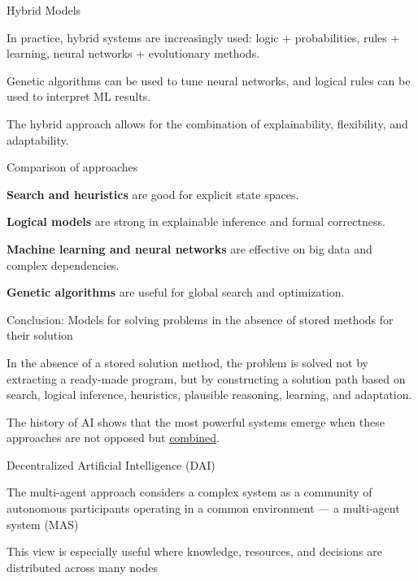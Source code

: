 \begin{frame}{Hybrid Models}
	\topline
	\justifying
	
	\begin{textitemize}
		\item In practice, hybrid systems are increasingly used: logic + probabilities, rules + learning, neural networks + evolutionary methods.
		\item Genetic algorithms can be used to tune neural networks, and logical rules can be used to interpret ML results.
		\item The hybrid approach allows for the combination of explainability, flexibility, and adaptability.
	\end{textitemize}
\end{frame}

\begin{frame}{Comparison of approaches}
	\topline
	\justifying
	
	\begin{textitemize}
		\item \textbf{Search and heuristics} are good for explicit state spaces.
		\item \textbf{Logical models} are strong in explainable inference and formal correctness.
		\item \textbf{Machine learning and neural networks} are effective on big data and complex dependencies.
		\item \textbf{Genetic algorithms} are useful for global search and optimization.
	\end{textitemize}
\end{frame}

\begin{frame}{Conclusion: Models for solving problems in the absence of stored methods for their solution}
	\topline
	\justifying
	
	In the absence of a stored solution method, the problem is solved not by extracting a ready-made program, but by constructing a solution path based on search, logical inference, heuristics, plausible reasoning, learning, and adaptation.
	
	\bigskip
	
	The history of AI shows that the most powerful systems emerge when these approaches are not opposed but \uline{combined}.
\end{frame}

\begin{frame}{Decentralized Artificial Intelligence (DAI)}
	\topline
	\justifying
	\begin{textitemize}
		\item The multi-agent approach considers a complex system as a community of autonomous participants operating in a common environment --- a multi-agent system (MAS)
		\item This view is especially useful where knowledge, resources, and decisions are distributed across many nodes
	\end{textitemize}
\end{frame}


